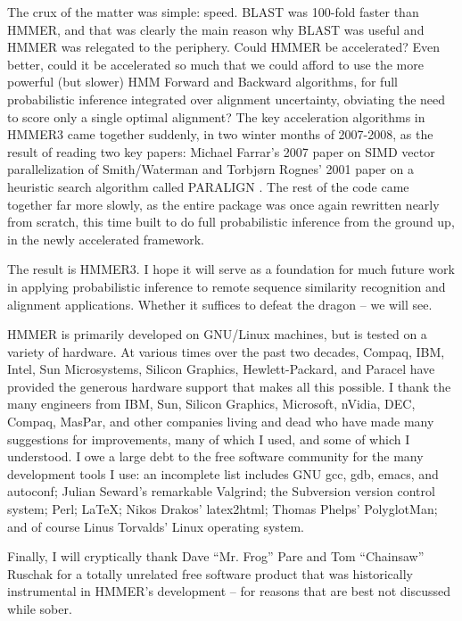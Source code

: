 The crux of the matter was simple: speed. BLAST was 100-fold faster
than HMMER, and that was clearly the main reason why BLAST was useful
and HMMER was relegated to the periphery. Could HMMER be accelerated?
Even better, could it be accelerated so much that we could afford to
use the more powerful (but slower) HMM Forward and Backward
algorithms, for full probabilistic inference integrated over alignment
uncertainty, obviating the need to score only a single optimal
alignment? The key acceleration algorithms in HMMER3 came together
suddenly, in two winter months of 2007-2008, as the result of reading
two key papers: Michael Farrar's 2007 paper on SIMD vector
parallelization of Smith/Waterman \citep{Farrar07} and Torbj{\o}rn
Rognes' 2001 paper on a heuristic search algorithm called PARALIGN
\citep{Rognes01}. The rest of the code came together far more slowly,
as the entire package was once again rewritten nearly from scratch,
this time built to do full probabilistic inference from the ground up,
in the newly accelerated framework.

The result is HMMER3. I hope it will serve as a foundation for much
future work in applying probabilistic inference to remote sequence
similarity recognition and alignment applications. Whether it suffices
to defeat the dragon -- we will see.


HMMER is primarily developed on GNU/Linux machines, but is tested on a
variety of hardware. At various times over the past two decades,
Compaq, IBM, Intel, Sun Microsystems, Silicon Graphics,
Hewlett-Packard, and Paracel have provided the generous hardware
support that makes all this possible. I thank the many engineers from
IBM, Sun, Silicon Graphics, Microsoft, nVidia, DEC, Compaq, MasPar,
and other companies living and dead who have made many suggestions for
improvements, many of which I used, and some of which I understood. I
owe a large debt to the free software community for the many
development tools I use: an incomplete list includes GNU gcc, gdb,
emacs, and autoconf; Julian Seward's remarkable Valgrind; the
Subversion version control system; Perl; \LaTeX; Nikos Drakos'
latex2html; Thomas Phelps' PolyglotMan; and of course Linus Torvalds'
Linux operating system.

Finally, I will cryptically thank Dave ``Mr. Frog'' Pare and Tom
``Chainsaw'' Ruschak for a totally unrelated free software product
that was historically instrumental in HMMER's development -- for
reasons that are best not discussed while sober.

\label{manualend}
